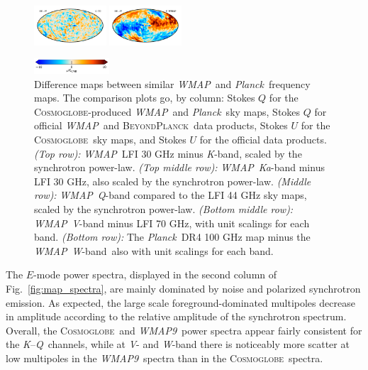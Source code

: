 \documentclass[twocolumn]{../../common/aa}
\def\WMAP{\emph{WMAP}}
\def\WMAPnine{\emph{WMAP9}}
\def\Planck{\emph{Planck}}
\newcommand{\BP}{\textsc{BeyondPlanck}}
\newcommand{\cosmoglobe}{\textsc{Cosmoglobe}}
\newcommand{\K}[0]{\textit K}
\newcommand{\Ka}[0]{\textit{Ka}}
\newcommand{\Q}[0]{\textit Q}
\newcommand{\V}[0]{\textit V}
\newcommand{\W}[0]{\textit W}
\begin{document}
\begin{figure}
	\includegraphics[width=0.24\textwidth]{figures/100W_deltaU.pdf}
	\includegraphics[width=0.24\textwidth]{figures/100W_W_deltaU.pdf}
	
        \includegraphics[width=0.25\textwidth]{figures/cbar_10uK.pdf}
	\caption{Difference maps between similar \WMAP\ and \Planck\ frequency maps. The comparison plots go, by column: Stokes $Q$ for the \cosmoglobe-produced \WMAP\ and \Planck\ sky maps, Stokes $Q$ for official \WMAP\ and \BP\ data products, Stokes $U$ for the \cosmoglobe\ sky maps, and Stokes $U$ for the official data products. \textit{(Top row):} \WMAP\ LFI 30 GHz minus \K-band, scaled by the synchrotron power-law. \textit{(Top middle row):} \WMAP\ \Ka-band minus LFI 30 GHz, also scaled by the synchrotron power-law. \textit{(Middle row):} \WMAP\ \Q-band compared to the LFI 44 GHz sky maps, scaled by the synchrotron power-law. \textit{(Bottom middle row):} \WMAP\ \V-band minus LFI 70 GHz, with unit scalings for each band. \textit{(Bottom row):} The \Planck\ DR4 100 GHz map minus the \WMAP\ \W-band\, also with unit scalings for each band.}
	\label{fig:wmap_lfi_compare}
\end{figure}

The $E$-mode power spectra, displayed in the second column of Fig.~\ref{fig:map_spectra}, are mainly dominated by noise and polarized synchrotron emission. As expected, the large scale foreground-dominated multipoles decrease in amplitude according to the relative amplitude of the synchrotron spectrum. Overall, the \cosmoglobe\ and \WMAPnine\ power spectra appear fairly consistent for the \K--\Q\ channels, while at \V- and \W-band there is noticeably more scatter at low multipoles in the \WMAPnine\ spectra than in the \cosmoglobe\ spectra.%
\end{document}
